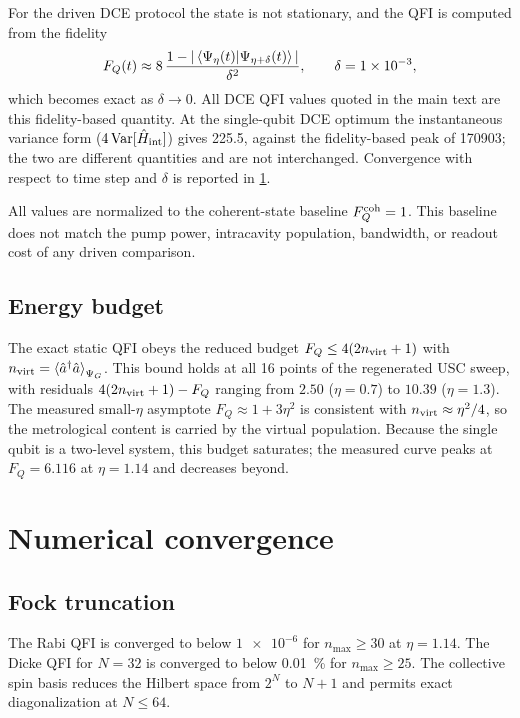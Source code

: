 \documentclass[aps,prxquantum,preprint,superscriptaddress,amsmath,amssymb]{revtex4-2}
\begin{document}
For the driven DCE protocol the state is not stationary, and the QFI is computed from the fidelity
\begin{equation}
F_Q(t) \approx 8\,\frac{1-|\braket{\Psi_\eta(t)|\Psi_{\eta+\delta}(t)}|}{\delta^2},
\qquad \delta=\num{1e-3},
\label{eq:si_qfi_time}
\end{equation}
which becomes exact as $\delta\to0$. All DCE QFI values quoted in the main text are this fidelity-based quantity. At the single-qubit DCE optimum the instantaneous variance form ($\num{4}\,\mathrm{Var}[\hat H_{\rm int}]$) gives \num{225.5}, against the fidelity-based peak of \num{170903}; the two are different quantities and are not interchanged. Convergence with respect to time step and $\delta$ is reported in \cref{sec:si_convergence}.

All values are normalized to the coherent-state baseline $F_Q^{\rm coh}=1$. This baseline does not match the pump power, intracavity population, bandwidth, or readout cost of any driven comparison.

\subsection{Energy budget}
\label{sec:si_energy_budget}

The exact static QFI obeys the reduced budget $F_Q\le 4(2n_{\rm virt}+1)$ with $n_{\rm virt}=\braket{\hat a^\dagger\hat a}_{\Psi_G}$. This bound holds at all 16 points of the regenerated USC sweep, with residuals $4(2n_{\rm virt}+1)-F_Q$ ranging from $\num{+2.50}$ ($\eta=\num{0.7}$) to $\num{+10.39}$ ($\eta=\num{1.3}$). The measured small-$\eta$ asymptote $F_Q\approx 1+3\eta^2$ is consistent with $n_{\rm virt}\approx\eta^2/4$, so the metrological content is carried by the virtual population. Because the single qubit is a two-level system, this budget saturates; the measured curve peaks at $F_Q=\num{6.116}$ at $\eta=\num{1.14}$ and decreases beyond.

\section{Numerical convergence}
\label{sec:si_convergence}

\subsection{Fock truncation}

The Rabi QFI is converged to below $\num{1e-6}$ for $n_{\max}\ge\num{30}$ at $\eta=\num{1.14}$. The Dicke QFI for $N=\num{32}$ is converged to below \qty{0.01}{\percent} for $n_{\max}\ge\num{25}$. The collective spin basis reduces the Hilbert space from $2^N$ to $N+1$ and permits exact diagonalization at $N\le\num{64}$.
\end{document}
